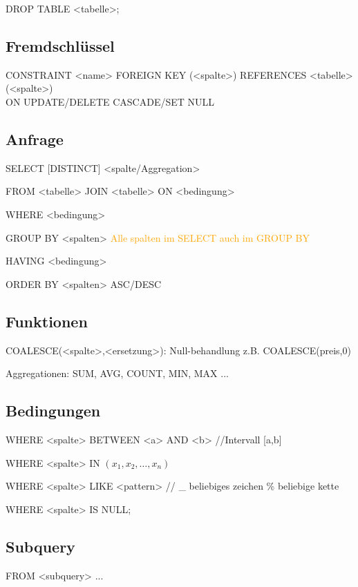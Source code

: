 DROP TABLE <tabelle>;

\subsection{Fremdschlüssel}
CONSTRAINT <name> FOREIGN KEY (<spalte>) REFERENCES <tabelle>(<spalte>)\\
ON UPDATE/DELETE    CASCADE/SET NULL



\subsection{Anfrage}
SELECT [DISTINCT] <spalte/Aggregation>      

FROM <tabelle> JOIN <tabelle> ON <bedingung> 

WHERE <bedingung>

GROUP BY <spalten>   \textcolor{orange}{ Alle spalten im SELECT auch im GROUP BY}

HAVING <bedingung>

ORDER BY <spalten> ASC/DESC






\subsection{Funktionen}
COALESCE(<spalte>,<ersetzung>): Null-behandlung z.B. COALESCE(preis,0)

Aggregationen: SUM, AVG, COUNT, MIN, MAX ...
\subsection{Bedingungen}
WHERE <spalte> BETWEEN <a> AND <b>    //Intervall [a,b]

WHERE <spalte> IN $(x_1, x_2,\dots , x_n)$

WHERE <spalte> LIKE <pattern>   // \_ beliebiges zeichen \% beliebige kette
 
WHERE <spalte> IS NULL;

\subsection{Subquery}
FROM <subquery> 
...

